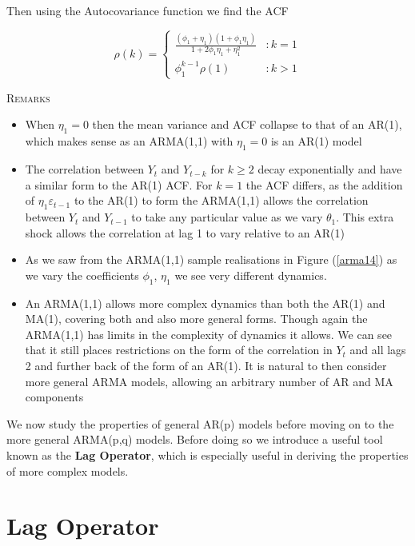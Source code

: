 \documentclass[openany]{tufte-book} %
\begin{document}
Then using the Autocovariance function we find the ACF


\[\rho(k) =\left\{
  \begin{array}{lr}
   \frac{(\phi_1+\eta_1)(1+\phi_1\eta_1)}{1+2\phi_1\eta_1+\eta_1^2}   & : k =1\\
    \phi_1^{k-1}\rho(1) & : k>1
  \end{array}
\right.
\]


\textsc{Remarks}
\begin{itemize}
\item When $\eta_1=0$ then the mean variance and ACF collapse to that of an AR(1), which makes sense as an ARMA(1,1) with $\eta_1=0$ is an AR(1) model

\item The correlation between $Y_t$ and $Y_{t-k}$ for $k \geq 2$ decay exponentially and have a similar form to the AR(1) ACF. For $k=1$ the ACF differs, as the addition of $\eta_1 \varepsilon_{t-1}$ to the AR(1) to form the ARMA(1,1) allows the correlation between $Y_t$ and $Y_{t-1}$ to take any particular value as we vary $\theta_1$. This extra shock allows the correlation at lag 1 to vary relative to an AR(1)

    \item As we saw from the ARMA(1,1) sample realisations in Figure (\ref{arma14}) as we vary the coefficients $\phi_1$, $\eta_1$ we see  very different dynamics.

    \item An ARMA(1,1) allows more complex dynamics than both the AR(1) and MA(1), covering both and also more general forms. Though again the ARMA(1,1) has limits in the complexity of dynamics it allows. We can see that it still places restrictions on the form of the correlation in $Y_t$ and all lags 2 and further back of the form of an AR(1).  It is natural to then consider more general ARMA models, allowing an arbitrary number of AR and MA components

        \end{itemize}


        We now study the properties of general AR(p) models before moving on to the more general ARMA(p,q) models. Before doing so we introduce a useful tool known as the \textbf{Lag Operator}, which is especially useful in deriving the properties of more complex models.


        \section{Lag Operator}
\end{document}
